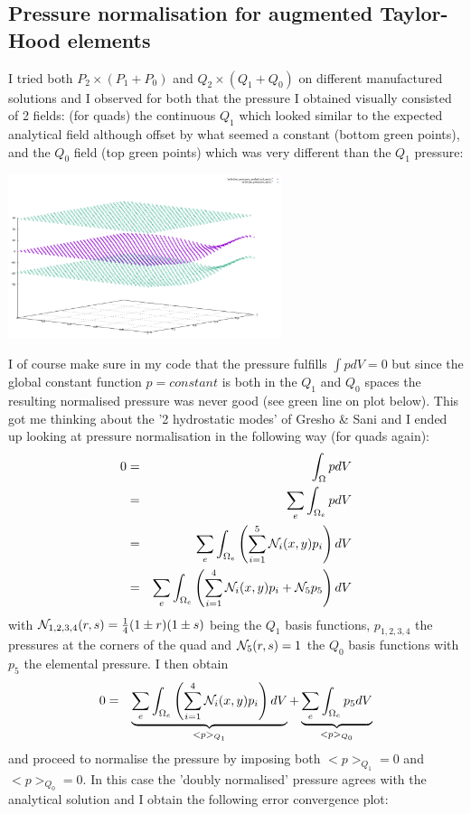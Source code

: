 \newpage
\subsection*{Pressure normalisation for augmented Taylor-Hood elements}


I tried both $P_2\times (P_1+P_0)$ and $Q_2\times (Q_1+Q_0)$ on different manufactured solutions 
and I observed for both that the pressure I obtained visually consisted of 2 fields: (for quads) 
the continuous $Q_1$ which looked similar to the expected analytical field although offset by what 
seemed a constant (bottom green points), and the $Q_0$ field (top green points) which was 
very different than the $Q_1$ pressure:

\begin{center}
\includegraphics[width=8cm]{python_codes/fieldstone_120/images/q2q1q0pb}
\end{center}

I of course make sure in my code that the pressure fulfills $\int p dV=0$ but since 
the global constant function $p=constant$ is both in the $Q_1$ and $Q_0$ spaces the 
resulting normalised pressure was never good (see green line on plot below). 
This got me thinking about the '2 hydrostatic modes' of Gresho \& Sani and
I ended up looking at pressure normalisation in the following way (for quads again):
\begin{eqnarray}
0 
&=& \int_\Omega p dV \nonumber\\
&=& \sum_e \int_{\Omega_e} p dV \nonumber\\
&=& \sum_e \int_{\Omega_e} \left( \sum_{i=1}^5 {\mathcal{N}}_i(x,y) p_i \right) dV \nonumber\\
&=& \sum_e \int_{\Omega_e} \left( \sum_{i=1}^4 {\mathcal{N}}_i(x,y) p_i + {\mathcal{N}}_5 p_5 \right) dV
\end{eqnarray}
with ${\mathcal{N}}_{1,2,3,4}(r,s)=\frac14(1\pm r)(1\pm s)$ being
the $Q_1$ basis functions, $p_{1,2,3,4}$ the pressures at the corners
of the quad and ${\mathcal{N}}_5(r,s)=1$ the $Q_0$ basis functions with $p_5$ the elemental pressure.
I then obtain 
\begin{eqnarray}
0 
&=& \underbrace{\sum_e \int_{\Omega_e} \left( \sum_{i=1}^4 {\mathcal{N}}_i(x,y) p_i \right) dV}_{<p>_{Q_1}}
+ \underbrace{\sum_e \int_{\Omega_e} p_5  dV}_{<p>_{Q_0}}
\end{eqnarray}
and proceed to normalise the pressure by imposing both $<p>_{Q_1}=0$ and $<p>_{Q_0}=0$.
In this case the 'doubly normalised' pressure agrees with the analytical solution 
and I obtain the following error convergence plot:

